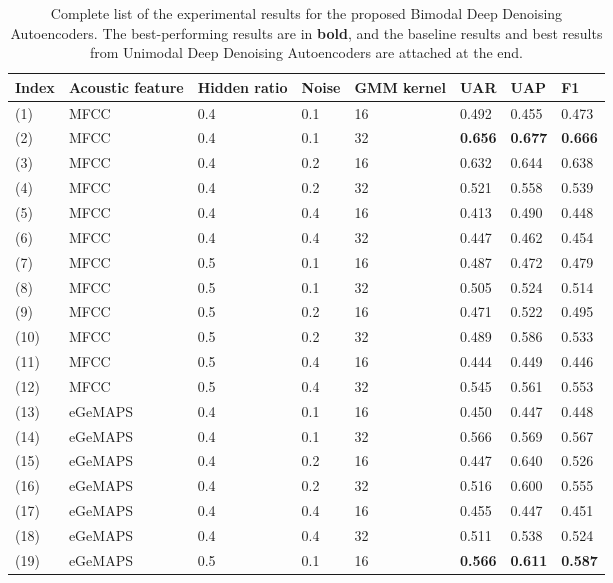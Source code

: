 \begin{table}[htb]
    \centering
    \small
    \caption{Complete list of the experimental results for the proposed Bimodal Deep Denoising Autoencoders. The best-performing results are in \textbf{bold}, and the baseline results and best results from Unimodal Deep Denoising Autoencoders are attached at the end.}
    \begin{tabular}{l|p{1.8cm}|p{1.25cm}|l|p{1.2cm}|l|l|l}
        \Xhline{2\arrayrulewidth}
        Index & Acoustic feature & Hidden ratio & Noise & GMM kernel & UAR & UAP & F1 \\
        \hline
        (1) & MFCC  & 0.4 & 0.1 & 16 & 0.492 & 0.455 & 0.473 \\
        (2) & MFCC  & 0.4 & 0.1 & 32 & \textbf{0.656} & \textbf{0.677} & \textbf{0.666} \\
        (3) & MFCC  & 0.4 & 0.2 & 16 & 0.632 & 0.644 & 0.638 \\
        (4) & MFCC  & 0.4 & 0.2 & 32 & 0.521 & 0.558 & 0.539 \\
        (5) & MFCC  & 0.4 & 0.4 & 16 & 0.413 & 0.490 & 0.448 \\
        (6) & MFCC  & 0.4 & 0.4 & 32 & 0.447 & 0.462 & 0.454 \\
        (7) & MFCC  & 0.5 & 0.1 & 16 & 0.487 & 0.472 & 0.479 \\
        (8) & MFCC  & 0.5 & 0.1 & 32 & 0.505 & 0.524 & 0.514 \\
        (9) & MFCC  & 0.5 & 0.2 & 16 & 0.471 & 0.522 & 0.495 \\
        (10) & MFCC  & 0.5 & 0.2 & 32 & 0.489 & 0.586 & 0.533 \\
        (11) & MFCC  & 0.5 & 0.4 & 16 & 0.444 & 0.449 & 0.446 \\
        (12) & MFCC  & 0.5 & 0.4 & 32 & 0.545 & 0.561 & 0.553 \\
        \hline
        (13) & eGeMAPS & 0.4 & 0.1 & 16 & 0.450 & 0.447 & 0.448 \\
        (14) & eGeMAPS & 0.4 & 0.1 & 32 & 0.566 & 0.569 & 0.567 \\
        (15) & eGeMAPS & 0.4 & 0.2 & 16 & 0.447 & 0.640 & 0.526 \\
        (16) & eGeMAPS & 0.4 & 0.2 & 32 & 0.516 & 0.600 & 0.555 \\
        (17) & eGeMAPS & 0.4 & 0.4 & 16 & 0.455 & 0.447 & 0.451 \\
        (18) & eGeMAPS & 0.4 & 0.4 & 32 & 0.511 & 0.538 & 0.524 \\
        (19) & eGeMAPS & 0.5 & 0.1 & 16 & \textbf{0.566} & \textbf{0.611} & \textbf{0.587} \\

\end{tabular}
\end{table}
